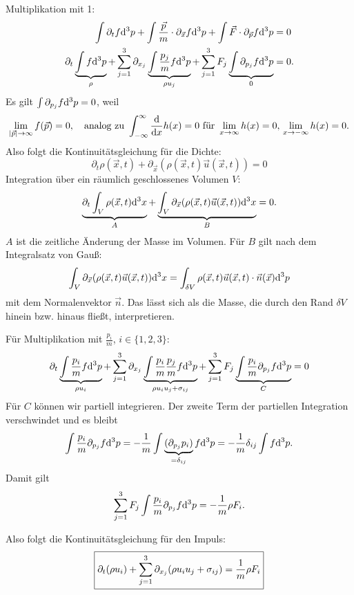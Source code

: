 Multiplikation mit 1:
\begin{align*}
  \int \partial_t f \mathrm{d}^3 p
  + \int \frac{\vec{p}}{m} \cdot \partial_{\vec{x}} f \mathrm{d}^3 p
  + \int \vec{F} \cdot \partial_{\vec{p}} f \mathrm{d}^3 p
  &= 0 \\
  \partial_t \underbrace{\int f \mathrm{d}^3 p}_{\rho}
  + \sum_{j=1}^3 \partial_{x_j}
  \underbrace{\int \frac{p_j}{m} f \mathrm{d}^3 p}_{\rho u_j}
  + \sum_{j=1}^3 F_j
  \underbrace{\int \partial_{p_j} f \mathrm{d}^3 p}_{0}
  &= 0.
\end{align*}
Es gilt $\int \partial_{p_j} f \mathrm{d}^3 p = 0$, weil
\[ \lim_{|\vec{p}| \to \infty} f(\vec{p}) = 0, \quad \text{analog zu } \int_{-
    \infty}^\infty \frac{\mathrm{d} }{\mathrm{d} x} h(x) = 0 \text{ für } \lim_{x \to \infty} h(x) =
  0, \, \lim_{x \to - \infty} h(x) = 0. \]
Also folgt die Kontinuitätsgleichung für die Dichte:
\[ \boxed{ \partial_t \rho( \vec{x}, t ) + \partial_{\vec{x}} (\rho(\vec{x},t)
    \vec{u}(\vec{x},t)) = 0 }\]
Integration über ein räumlich geschlossenes Volumen $V$:
\[ \underbrace{\partial_t \int_V \rho(\vec{x},t) \mathrm{d}^3 x}_{A} +
  \underbrace{\int_V \partial_{\vec{x}} (\rho(\vec{x},t) \vec{u}(\vec{x},t))
    \mathrm{d}^3 x}_{B} = 0. \]
$A$ ist die zeitliche Änderung der Masse im Volumen. Für $B$ gilt nach dem
Integralsatz von Gauß:
\[ \int_V \partial_{\vec{x}} (\rho(\vec{x},t) \vec{u}(\vec{x},t))
  \mathrm{d}^3 x
  = \int_{\delta V} \rho(\vec{x},t) \vec{u}(\vec{x},t) \cdot \vec{n}(\vec{x})
  \mathrm{d}^3 p \]
mit dem Normalenvektor $\vec{n}$. Das lässt sich als die Masse, die durch den Rand
$\delta V$ hinein bzw. hinaus fließt, interpretieren.

Für Multiplikation mit $\frac{p_i}{m}$, $i \in \{1,2,3\}$:
\begin{align*}
  \partial_t
  \underbrace{\int \frac{p_i}{m} f \mathrm{d}^3 p}_{\rho u_i}
  + \sum_{j=1}^3 \partial_{x_j}
  \underbrace{\int \frac{p_i}{m} \frac{p_j}{m} f
  \mathrm{d}^3 p}_{\rho u_i u_j + \sigma_{ij}}
  + \sum_{j=1}^3 F_j
  \underbrace{\int \frac{p_i}{m} \partial_{p_j} f \mathrm{d}^3 p}_{C}
  = 0
\end{align*}
Für $C$ können wir partiell integrieren. Der zweite Term der partiellen
Integration verschwindet und es bleibt
\[ \int \frac{p_i}{m} \partial_{p_j} f \mathrm{d}^3 p = - \frac{1}{m} \int
  \underbrace{(\partial_{p_j} p_i)}_{=\delta_{ij}} f \mathrm{d}^3 p
  = - \frac{1}{m} \delta_{ij} \int f \mathrm{d}^3 p. \]
Damit gilt
\[ \sum_{j=1}^3 F_j \int \frac{p_i}{m} \partial_{p_j} f \mathrm{d}^3 p
  = - \frac{1}{m} \rho F_i. \]

Also folgt die Kontinuitätsgleichung für den Impuls:
\[ \boxed{ \partial_t (\rho u_i) + \sum_{j=1}^3 \partial_{x_j} ( \rho u_i u_j +
    \sigma_{ij}) = \frac{1}{m} \rho F_i }\]

